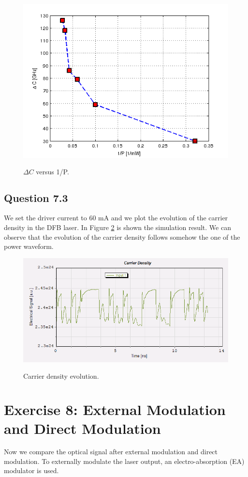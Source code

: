 \documentclass[a4paper,10pt]{report}
\begin{document}
\begin{figure}[!ht]
  \centering
  \includegraphics[width=12cm]{7_punto2.png}\\
  \caption{$\Delta C$ versus 1/P.}
  \label{7_punto2}
\end{figure}


\subsection*{Question 7.3}
We set the driver current to 60 mA and we plot the evolution of the carrier density in the DFB laser. In Figure \ref{7_punto32} is shown the
simulation result. We can observe that the evolution of the carrier density follows somehow the one of the power waveform.

\begin{figure}[!ht]
  \centering
  \includegraphics[width=12cm]{7_punto32.png}\\
  \caption{Carrier density evolution.}
  \label{7_punto32}
\end{figure}


\newpage
\section*{Exercise 8: External Modulation and Direct Modulation}
Now we compare the optical signal after external modulation and direct modulation. To externally modulate the laser output, an electro-absorption
(EA) modulator is used.
\end{document}

